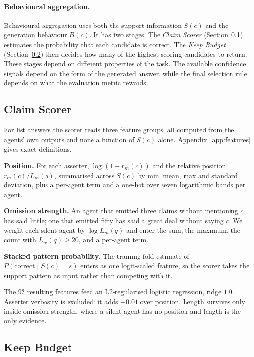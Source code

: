 \documentclass{article}
\begin{document}
\paragraph{Behavioural aggregation.}
Behavioural aggregation uses both the support information $S(c)$ and the generation
behaviour $B(c)$. It has two stages. The \emph{Claim Scorer}
(Section~\ref{sec:slotA}) estimates the probability that each candidate is correct. The
\emph{Keep Budget} (Section~\ref{sec:slotB}) then decides how many of the highest-scoring
candidates to return. These stages depend on different properties of the task. The
available confidence signals depend on the form of the generated answer, while the final
selection rule depends on what the evaluation metric rewards.

\subsection{Claim Scorer}
\label{sec:slotA}

For list answers the scorer reads three feature groups, all computed from the agents'
own outputs and none a function of $S(c)$ alone. Appendix~\ref{app:features} gives exact
definitions.

\textbf{Position.} For each asserter, $\log(1 + r_m(c))$ and the relative position
$r_m(c)/L_m(q)$, summarised across $S(c)$ by min, mean, max and standard deviation, plus
a per-agent term and a one-hot over seven logarithmic bands per agent.

\textbf{Omission strength.} An agent that emitted three claims without mentioning $c$ has
said little; one that emitted fifty has said a great deal without saying $c$. We weight
each silent agent by $\log L_m(q)$ and enter the sum, the maximum, the count with
$L_m(q) \geq 20$, and a per-agent term.

\textbf{Stacked pattern probability.} The training-fold estimate of
$P(\mathrm{correct} \mid S(c) = s)$ enters as one logit-scaled feature, so the scorer
takes the support pattern as input rather than competing with it.

The 92 resulting features feed an L2-regularised logistic regression, ridge $1.0$.
Asserter verbosity is excluded: it adds $+0.01$ over position. Length survives only
inside omission strength, where a silent agent has no position and length is the only
evidence.

\subsection{Keep Budget}
\label{sec:slotB}
\end{document}
